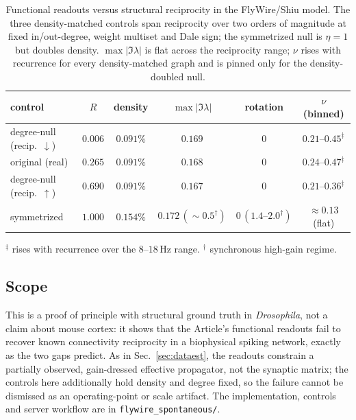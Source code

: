 \documentclass[11pt]{article}
\begin{document}
\begin{table}[h]
\centering
\caption{Functional readouts versus structural reciprocity in the FlyWire/Shiu
model. The three density-matched controls span reciprocity over two orders of
magnitude at fixed in/out-degree, weight multiset and Dale sign; the symmetrized
null is $\eta=1$ but doubles density. $\max|\Im\lambda|$ is flat across the
reciprocity range; $\nu$ rises with recurrence for every density-matched graph
and is pinned only for the density-doubled null.}
\label{tab:flywire}
\begin{tabular}{lccccc}
\toprule
control & $R$ & density & $\max|\Im\lambda|$ & rotation & $\nu$ (binned)\\
\midrule
degree-null (recip.\ $\downarrow$) & $0.006$ & $0.091\%$ & $0.169$ & $0$ & $0.21$--$0.45^{\ddagger}$\\
original (real) & $0.265$ & $0.091\%$ & $0.168$ & $0$ & $0.24$--$0.47^{\ddagger}$\\
degree-null (recip.\ $\uparrow$) & $0.690$ & $0.091\%$ & $0.167$ & $0$ & $0.21$--$0.36^{\ddagger}$\\
symmetrized & $1.000$ & $0.154\%$ & $0.172\,(\sim0.5^{\dagger})$ & $0\,(1.4\text{--}2.0^{\dagger})$ & $\approx0.13$ (flat)\\
\bottomrule
\end{tabular}

\smallskip
{\footnotesize $^{\ddagger}$ rises with recurrence over the $8$--$18$\,Hz range.
\quad $^{\dagger}$ synchronous high-gain regime.}
\end{table}

\subsection{Scope}
This is a proof of principle with structural ground truth in \emph{Drosophila},
not a claim about mouse cortex: it shows that the Article's functional readouts
fail to recover known connectivity reciprocity in a biophysical spiking network,
exactly as the two gaps predict. As in Sec.~\ref{sec:dataest}, the readouts
constrain a partially observed, gain-dressed effective propagator, not the
synaptic matrix; the controls here additionally hold density and degree fixed, so
the failure cannot be dismissed as an operating-point or scale artifact. The
implementation, controls and server workflow are in
\texttt{flywire\_spontaneous/}.
\end{document}
